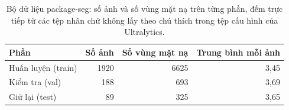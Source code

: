 \begin{table}[H]
\centering
\caption{Bộ dữ liệu package-seg: số ảnh và số vùng mặt nạ trên từng phần, đếm trực tiếp từ các tệp nhãn chứ không lấy theo chú thích trong tệp cấu hình của Ultralytics.}
\label{tab:dataset}
\small
\begin{tabular}{l r r r}
\toprule
Phần & Số ảnh & Số vùng mặt nạ & Trung bình mỗi ảnh \\
\midrule
Huấn luyện (train) & 1920 & 6625 & 3{,}45 \\
Kiểm tra (val) & 188 & 693 & 3{,}69 \\
Giữ lại (test) & 89 & 325 & 3{,}65 \\
\bottomrule
\end{tabular}
\end{table}
